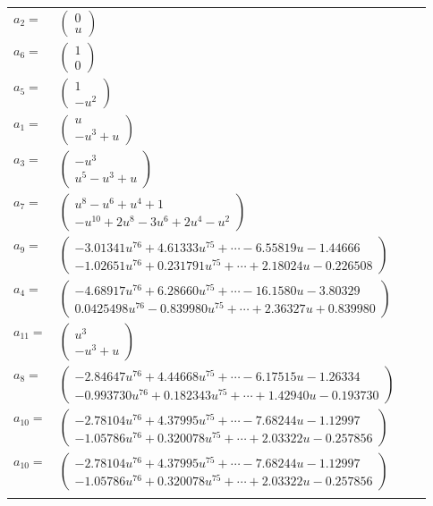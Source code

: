 \documentclass[1p]{elsarticle_modified}
\theoremstyle{definition}
\begin{document}
\begin{tabular}{m{7pt} m{180pt} m{7pt} m{180pt} }
\flushright $a_{2}=$&$\begin{pmatrix}0\\u\end{pmatrix}$ \\
\flushright $a_{6}=$&$\begin{pmatrix}1\\0\end{pmatrix}$ \\
\flushright $a_{5}=$&$\begin{pmatrix}1\\- u^2\end{pmatrix}$ \\
\flushright $a_{1}=$&$\begin{pmatrix}u\\- u^3+u\end{pmatrix}$ \\
\flushright $a_{3}=$&$\begin{pmatrix}- u^3\\u^5- u^3+u\end{pmatrix}$ \\
\flushright $a_{7}=$&$\begin{pmatrix}u^8- u^6+u^4+1\\- u^{10}+2 u^8-3 u^6+2 u^4- u^2\end{pmatrix}$ \\
\flushright $a_{9}=$&$\begin{pmatrix}-3.01341 u^{76}+4.61333 u^{75}+\cdots-6.55819 u-1.44666\\-1.02651 u^{76}+0.231791 u^{75}+\cdots+2.18024 u-0.226508\end{pmatrix}$ \\
\flushright $a_{4}=$&$\begin{pmatrix}-4.68917 u^{76}+6.28660 u^{75}+\cdots-16.1580 u-3.80329\\0.0425498 u^{76}-0.839980 u^{75}+\cdots+2.36327 u+0.839980\end{pmatrix}$ \\
\flushright $a_{11}=$&$\begin{pmatrix}u^3\\- u^3+u\end{pmatrix}$ \\
\flushright $a_{8}=$&$\begin{pmatrix}-2.84647 u^{76}+4.44668 u^{75}+\cdots-6.17515 u-1.26334\\-0.993730 u^{76}+0.182343 u^{75}+\cdots+1.42940 u-0.193730\end{pmatrix}$ \\
\flushright $a_{10}=$&$\begin{pmatrix}-2.78104 u^{76}+4.37995 u^{75}+\cdots-7.68244 u-1.12997\\-1.05786 u^{76}+0.320078 u^{75}+\cdots+2.03322 u-0.257856\end{pmatrix}$\\ \flushright $a_{10}=$&$\begin{pmatrix}-2.78104 u^{76}+4.37995 u^{75}+\cdots-7.68244 u-1.12997\\-1.05786 u^{76}+0.320078 u^{75}+\cdots+2.03322 u-0.257856\end{pmatrix}$\\&\end{tabular}
\end{document}
